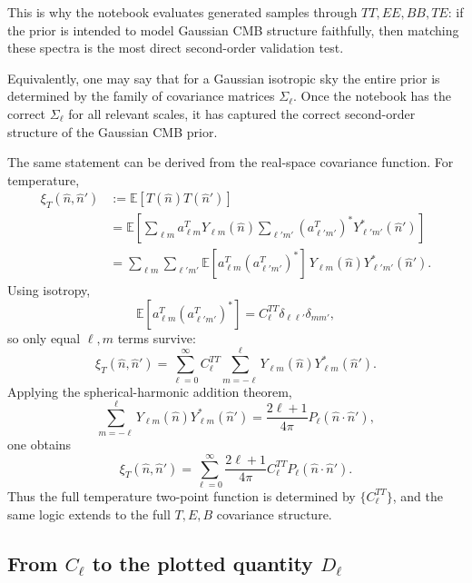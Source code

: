 \documentclass[11pt]{article}
\newcommand{\EE}{\mathbb{E}}
\begin{document}
This is why the notebook evaluates generated samples through \(TT,EE,BB,TE\): if the prior is intended to model Gaussian CMB structure faithfully, then matching these spectra is the most direct second-order validation test.

Equivalently, one may say that for a Gaussian isotropic sky the entire prior is determined by the family of covariance matrices \(\Sigma_\ell\). Once the notebook has the correct \(\Sigma_\ell\) for all relevant scales, it has captured the correct second-order structure of the Gaussian CMB prior.

The same statement can be derived from the real-space covariance function. For temperature,
\begin{align}
  \xi_T(\hat n,\hat n')
  &:= \EE[T(\hat n)T(\hat n')] \\
  &= \EE\!\left[
    \sum_{\ell m} a_{\ell m}^T Y_{\ell m}(\hat n)
    \sum_{\ell' m'} (a_{\ell' m'}^T)^\ast Y_{\ell' m'}^\ast(\hat n')
  \right] \\
  &= \sum_{\ell m}\sum_{\ell' m'}
     \EE[a_{\ell m}^T(a_{\ell' m'}^T)^\ast]\,
     Y_{\ell m}(\hat n)Y_{\ell' m'}^\ast(\hat n').
\end{align}
Using isotropy,
\begin{equation}
  \EE[a_{\ell m}^T(a_{\ell' m'}^T)^\ast]
  =
  C_\ell^{TT}\delta_{\ell\ell'}\delta_{mm'},
\end{equation}
so only equal \(\ell,m\) terms survive:
\begin{equation}
  \xi_T(\hat n,\hat n')
  =
  \sum_{\ell=0}^\infty C_\ell^{TT}
  \sum_{m=-\ell}^{\ell} Y_{\ell m}(\hat n)Y_{\ell m}^\ast(\hat n').
\end{equation}
Applying the spherical-harmonic addition theorem,
\begin{equation}
  \sum_{m=-\ell}^{\ell} Y_{\ell m}(\hat n)Y_{\ell m}^\ast(\hat n')
  =
  \frac{2\ell+1}{4\pi}P_\ell(\hat n\!\cdot\!\hat n'),
\end{equation}
one obtains
\begin{equation}
  \xi_T(\hat n,\hat n')
  =
  \sum_{\ell=0}^\infty \frac{2\ell+1}{4\pi} C_\ell^{TT}
  P_\ell(\hat n\!\cdot\!\hat n').
\end{equation}
Thus the full temperature two-point function is determined by \(\{C_\ell^{TT}\}\), and the same logic extends to the full \(T,E,B\) covariance structure.

\subsection{From \(C_\ell\) to the plotted quantity \(D_\ell\)}
\end{document}

